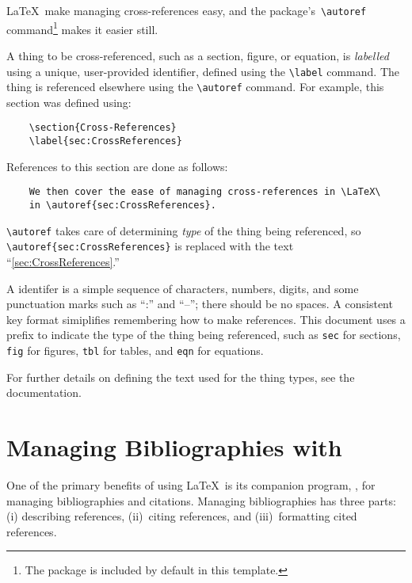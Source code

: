 \LaTeX\ make managing cross-references easy, and the 
package's\ \verb+\autoref+ command\footnote{%
    The  package is included by default in this
    template.}
makes it easier still. 

A thing to be cross-referenced, such as a section, figure, or equation,
is \emph{labelled} using a unique, user-provided identifier, defined
using the \verb+\label+ command.  
The thing is referenced elsewhere using the \verb+\autoref+ command.
For example, this section was defined using:
\begin{lstlisting}
    \section{Cross-References}
    \label{sec:CrossReferences}
\end{lstlisting}
References to this section are done as follows:
\begin{lstlisting}
    We then cover the ease of managing cross-references in \LaTeX\
    in \autoref{sec:CrossReferences}.
\end{lstlisting}
\verb+\autoref+ takes care of determining \emph{type} of the 
thing being referenced, so \verb+\autoref{sec:CrossReferences}+
is replaced with the text ``\autoref{sec:CrossReferences}.''

A identifer is a simple sequence of characters, numbers, digits,
and some punctuation marks such as ``:'' and ``--''; there should
be no spaces.  A consistent key format simiplifies remembering how
to make references.  This document uses a prefix to indicate the
type of the thing being referenced, such as \texttt{sec} for sections,
\texttt{fig} for figures, \texttt{tbl} for tables, and \texttt{eqn}
for equations.

For further details on defining the text used for the thing types,
see the \class{hyperref} documentation.


\section{Managing Bibliographies with \BibTeX}
\label{sec:BibTeX}

One of the primary benefits of using \LaTeX\ is its companion program,
\BibTeX, for managing bibliographies and citations.  Managing
bibliographies has three parts: (i) describing references,
(ii)~citing references, and (iii)~formatting cited references.

